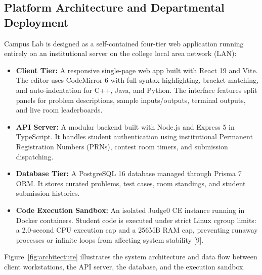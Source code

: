 \documentclass[12pt,a4paper]{article}
\begin{document}
\subsection{Platform Architecture and Departmental Deployment}
Campus Lab is designed as a self-contained four-tier web application running entirely on an institutional server on the college local area network (LAN):
\begin{itemize}[leftmargin=1.5em, itemsep=1.5pt]
    \item \textbf{Client Tier:} A responsive single-page web app built with React 19 and Vite. The editor uses CodeMirror 6 with full syntax highlighting, bracket matching, and auto-indentation for C++, Java, and Python. The interface features split panels for problem descriptions, sample inputs/outputs, terminal outputs, and live room leaderboards.
    \item \textbf{API Server:} A modular backend built with Node.js and Express 5 in TypeScript. It handles student authentication using institutional Permanent Registration Numbers (PRNs), contest room timers, and submission dispatching.
    \item \textbf{Database Tier:} A PostgreSQL 16 database managed through Prisma 7 ORM. It stores curated problems, test cases, room standings, and student submission histories.
    \item \textbf{Code Execution Sandbox:} An isolated Judge0 CE instance running in Docker containers. Student code is executed under strict Linux cgroup limits: a 2.0-second CPU execution cap and a 256MB RAM cap, preventing runaway processes or infinite loops from affecting system stability [9].
\end{itemize}

Figure~\ref{fig:architecture} illustrates the system architecture and data flow between client workstations, the API server, the database, and the execution sandbox.
\end{document}
